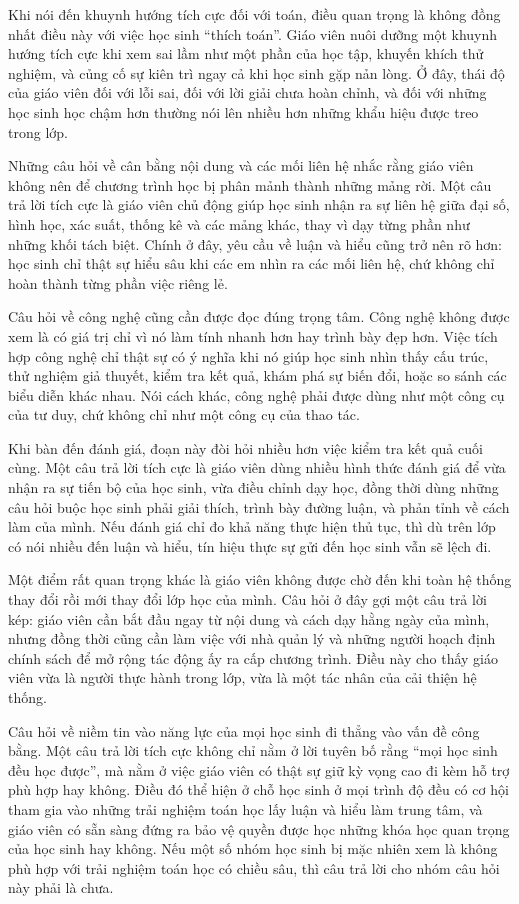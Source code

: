 \documentclass[
  10pt,
  a4paper,
  landscape,
  twoside,
  openany
]{scrbook}
\begin{document}
{{Khi nói đến khuynh hướng tích cực đối với toán, điều quan trọng là không đồng nhất điều này với việc học sinh “thích toán”. Giáo viên nuôi dưỡng một khuynh hướng tích cực khi xem sai lầm như một phần của học tập, khuyến khích thử nghiệm, và củng cố sự kiên trì ngay cả khi học sinh gặp nản lòng. Ở đây, thái độ của giáo viên đối với lỗi sai, đối với lời giải chưa hoàn chỉnh, và đối với những học sinh học chậm hơn thường nói lên nhiều hơn những khẩu hiệu được treo trong lớp.

Những câu hỏi về cân bằng nội dung và các mối liên hệ nhắc rằng giáo viên không nên để chương trình học bị phân mảnh thành những mảng rời. Một câu trả lời tích cực là giáo viên chủ động giúp học sinh nhận ra sự liên hệ giữa đại số, hình học, xác suất, thống kê và các mảng khác, thay vì dạy từng phần như những khối tách biệt. Chính ở đây, yêu cầu về luận và hiểu cũng trở nên rõ hơn: học sinh chỉ thật sự hiểu sâu khi các em nhìn ra các mối liên hệ, chứ không chỉ hoàn thành từng phần việc riêng lẻ.

Câu hỏi về công nghệ cũng cần được đọc đúng trọng tâm. Công nghệ không được xem là có giá trị chỉ vì nó làm tính nhanh hơn hay trình bày đẹp hơn. Việc tích hợp công nghệ chỉ thật sự có ý nghĩa khi nó giúp học sinh nhìn thấy cấu trúc, thử nghiệm giả thuyết, kiểm tra kết quả, khám phá sự biến đổi, hoặc so sánh các biểu diễn khác nhau. Nói cách khác, công nghệ phải được dùng như một công cụ của tư duy, chứ không chỉ như một công cụ của thao tác.

Khi bàn đến đánh giá, đoạn này đòi hỏi nhiều hơn việc kiểm tra kết quả cuối cùng. Một câu trả lời tích cực là giáo viên dùng nhiều hình thức đánh giá để vừa nhận ra sự tiến bộ của học sinh, vừa điều chỉnh dạy học, đồng thời dùng những câu hỏi buộc học sinh phải giải thích, trình bày đường luận, và phản tỉnh về cách làm của mình. Nếu đánh giá chỉ đo khả năng thực hiện thủ tục, thì dù trên lớp có nói nhiều đến luận và hiểu, tín hiệu thực sự gửi đến học sinh vẫn sẽ lệch đi.

Một điểm rất quan trọng khác là giáo viên không được chờ đến khi toàn hệ thống thay đổi rồi mới thay đổi lớp học của mình. Câu hỏi ở đây gợi một câu trả lời kép: giáo viên cần bắt đầu ngay từ nội dung và cách dạy hằng ngày của mình, nhưng đồng thời cũng cần làm việc với nhà quản lý và những người hoạch định chính sách để mở rộng tác động ấy ra cấp chương trình. Điều này cho thấy giáo viên vừa là người thực hành trong lớp, vừa là một tác nhân của cải thiện hệ thống.

Câu hỏi về niềm tin vào năng lực của mọi học sinh đi thẳng vào vấn đề công bằng. Một câu trả lời tích cực không chỉ nằm ở lời tuyên bố rằng “mọi học sinh đều học được”, mà nằm ở việc giáo viên có thật sự giữ kỳ vọng cao đi kèm hỗ trợ phù hợp hay không. Điều đó thể hiện ở chỗ học sinh ở mọi trình độ đều có cơ hội tham gia vào những trải nghiệm toán học lấy luận và hiểu làm trung tâm, và giáo viên có sẵn sàng đứng ra bảo vệ quyền được học những khóa học quan trọng của học sinh hay không. Nếu một số nhóm học sinh bị mặc nhiên xem là không phù hợp với trải nghiệm toán học có chiều sâu, thì câu trả lời cho nhóm câu hỏi này phải là chưa.

}}
\end{document}
